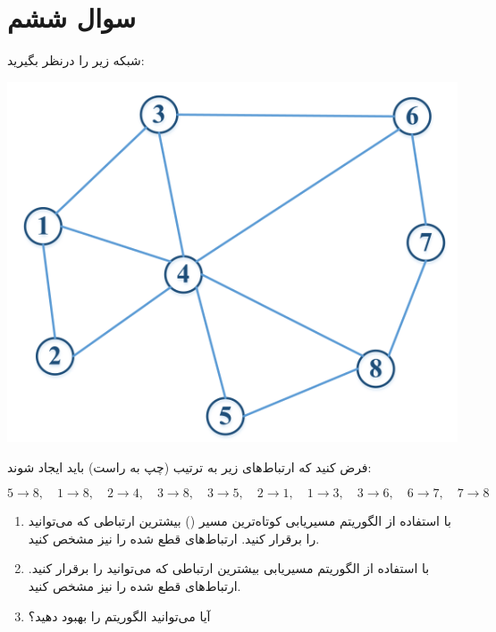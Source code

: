 \section{سوال ششم}

شبکه زیر را درنظر بگیرید:

\begin{center}
	\includegraphics*[width=0.5\linewidth]{pics/img1.png}
\end{center}


فرض کنید که ارتباط‌های زیر به ترتیب (چپ به راست) باید ایجاد شوند:

\begin{latin}
	$$ 
	5 \rightarrow 8, \quad 1 \rightarrow 8, \quad 2 \rightarrow 4, \quad 3 \rightarrow 8, \quad 3 \rightarrow 5, \quad 2 \rightarrow 1, \quad 1 \rightarrow 3, \quad 3 \rightarrow 6, \quad 6 \rightarrow 7, \quad 7 \rightarrow 8
	$$
\end{latin}

\begin{enumerate}
	\item 
	با استفاده از الگوریتم مسیریابی کوتاه‌ترین مسیر () بیشترین ارتباطی که می‌توانید را برقرار کنید. ارتباط‌های قطع شده را نیز مشخص کنید.
	
	
	\item 
	با استفاده از الگوریتم مسیریابی  بیشترین ارتباطی که می‌توانید را برقرار کنید. ارتباط‌های قطع شده را نیز مشخص کنید.
	
	
	\item 
	آیا می‌توانید الگوریتم  را بهبود دهید؟
\end{enumerate}
